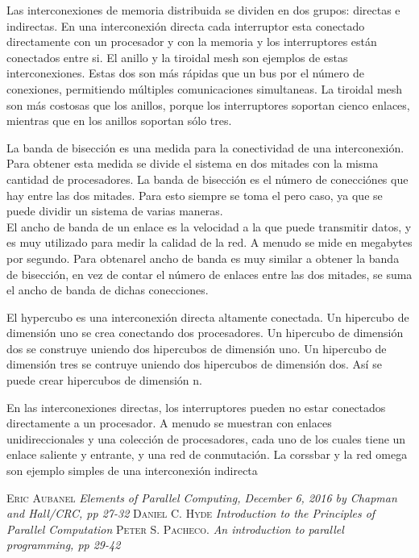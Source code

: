\documentclass[a4paper,12pt]{article}
\begin{document}
Las interconexiones de memoria distribuida se dividen en dos grupos: directas e indirectas. En una interconexión directa
cada interruptor esta conectado directamente con un procesador y con la memoria y los interruptores están conectados entre si.
El anillo y la tiroidal mesh son ejemplos de estas interconexiones. Estas dos son más rápidas que un bus por el número de conexiones,
permitiendo múltiples comunicaciones simultaneas. La tiroidal mesh son más costosas que los anillos, porque los interruptores
soportan cienco enlaces, mientras que en los anillos soportan sólo tres. \par

La banda de bisección es una medida para la conectividad de una interconexión. Para obtener esta medida se divide el sistema
en dos mitades con la misma cantidad de procesadores. La banda de bisección es el número de conecciónes que hay entre las
dos mitades. Para esto siempre se toma el pero caso, ya que se puede dividir un sistema de varias maneras.\\
El ancho de banda de un enlace es la velocidad a la que puede transmitir datos, y es muy utilizado para medir la calidad de la red. 
A menudo se mide en megabytes por segundo. Para obtenarel ancho de banda es muy similar a obtener la banda de bisección,
en vez de contar el número de enlaces entre las dos mitades, se suma el ancho de banda de dichas conecciones. \par

El hypercubo es una interconexión directa altamente conectada. Un hipercubo de dimensión uno se crea conectando dos
procesadores. Un hipercubo de dimensión dos se construye uniendo dos hipercubos de dimensión uno. Un hipercubo de
dimensión tres se contruye uniendo dos hipercubos de dimensión dos. Así se puede crear hipercubos de dimensión n. \par

En las interconexiones directas, los interruptores pueden no estar conectados directamente a un procesador. 
A menudo se muestran con enlaces unidireccionales y una colección de procesadores, cada uno de los cuales
tiene un enlace saliente y entrante, y una red de conmutación. La corssbar y la red omega son ejemplo simples de una
interconexión indirecta

\begin{thebibliography}{X}
   \textsc{Eric Aubanel} \textit{Elements of Parallel Computing, December 6, 2016 by Chapman and Hall/CRC, pp 27-32}
  \textsc{Daniel C. Hyde} \textit{Introduction to the Principles of Parallel Computation}
  \textsc{Peter S. Pacheco.} \textit{An introduction to parallel programming, pp 29-42}
\end{thebibliography}
\end{document}

